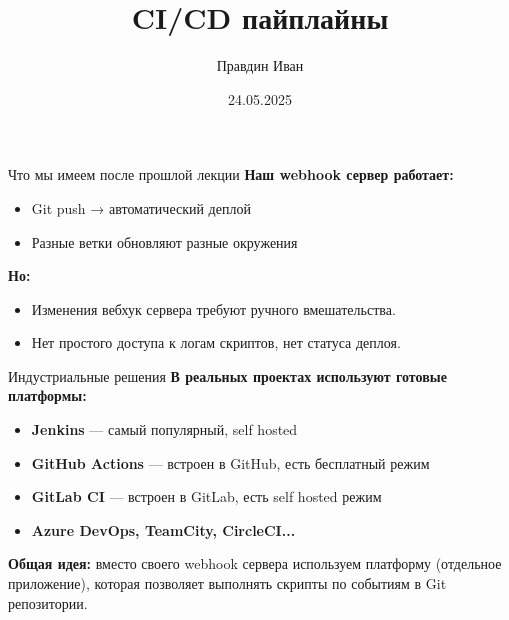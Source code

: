 \documentclass[aspectratio=169]{beamer}
\title{CI/CD пайплайны}
\author{Правдин Иван}
\date{24.05.2025}
\begin{document}
    \maketitle

    \begin{frame}{Что мы имеем после прошлой лекции}
        \textbf{Наш webhook сервер работает:}
        
        \begin{itemize}
            \item Git push → автоматический деплой
            \item Разные ветки обновляют разные окружения
        \end{itemize}

        \textbf{Но:}

        \begin{itemize}
            \item Изменения вебхук сервера требуют ручного вмешательства.
            \item Нет простого доступа к логам скриптов, нет статуса деплоя.
        \end{itemize}
    \end{frame}

    \begin{frame}{Индустриальные решения}
        \textbf{В реальных проектах используют готовые платформы:}
        
        \begin{itemize}
            \item \textbf{Jenkins} — самый популярный, self hosted
            \item \textbf{GitHub Actions} — встроен в GitHub, есть бесплатный режим
            \item \textbf{GitLab CI} — встроен в GitLab, есть self hosted режим
            \item \textbf{Azure DevOps, TeamCity, CircleCI...}
        \end{itemize}
        
        \vspace{0.5cm}
        
        \textbf{Общая идея:} вместо своего webhook сервера используем платформу (отдельное приложение), которая позволяет выполнять
        скрипты по событиям в Git репозитории.
    \end{frame}
\end{document}

